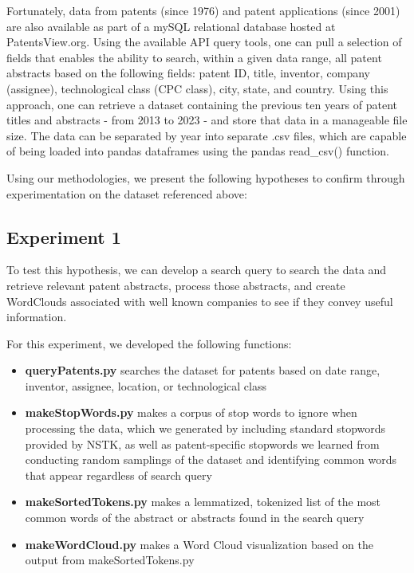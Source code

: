 \documentclass{article}
\begin{document}
Fortunately, data from patents (since 1976) and patent applications (since 2001) are also available as part of a mySQL relational database hosted at PatentsView.org\cite{website:pv1}. Using the available API query tools\cite{website:pv2}, one can pull a selection of fields that enables the ability to search, within a given data range, all patent abstracts based on the following fields: patent ID, title, inventor, company (assignee), technological class (CPC class), city, state, and country.  Using this approach, one can retrieve a dataset containing the previous ten years of patent titles and abstracts - from 2013 to 2023 - and store that data in a manageable file size. The data can be separated by year into separate .csv files, which are capable of being loaded into pandas dataframes using the pandas read\_csv() function.

Using our methodologies, we present the following hypotheses to confirm through experimentation on the dataset referenced above:

\subsection{Experiment 1}
\noindent{}

To test this hypothesis, we can develop a search query to search the data and retrieve relevant patent abstracts, process those abstracts, and create WordClouds associated with well known companies to see if they convey useful information.

For this experiment, we developed the following functions:
\begin{itemize}
  \item \textbf{queryPatents.py} searches the dataset for patents based on date range, inventor, assignee, location, or technological class
  \item \textbf{makeStopWords.py} makes a corpus of stop words to ignore when processing the data, which we generated by including standard stopwords provided by NSTK, as well as patent-specific stopwords we learned from conducting random samplings of the dataset and identifying common words that appear regardless of search query
  \item \textbf{makeSortedTokens.py} makes a lemmatized, tokenized list of the most common words of the abstract or abstracts found in the search query
  \item \textbf{makeWordCloud.py} makes a Word Cloud visualization based on the output from makeSortedTokens.py
\end{itemize}
\end{document}
